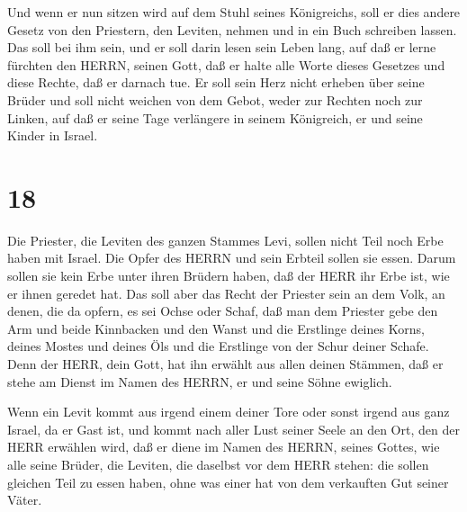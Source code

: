  Und wenn er nun sitzen wird auf dem Stuhl seines
Königreichs, soll er dies andere Gesetz von den Priestern, den Leviten,
nehmen und in ein Buch schreiben lassen.  Das soll bei ihm
sein, und er soll darin lesen sein Leben lang, auf daß er lerne fürchten
den HERRN, seinen Gott, daß er halte alle Worte dieses Gesetzes und
diese Rechte, daß er darnach tue.  Er soll sein Herz nicht
erheben über seine Brüder und soll nicht weichen von dem Gebot, weder
zur Rechten noch zur Linken, auf daß er seine Tage verlängere in seinem
Königreich, er und seine Kinder in Israel.

\hypertarget{section-17}{%
\section{18}\label{section-17}}

 Die Priester, die Leviten des ganzen Stammes Levi, sollen
nicht Teil noch Erbe haben mit Israel. Die Opfer des HERRN und sein
Erbteil sollen sie essen.  Darum sollen sie kein Erbe unter
ihren Brüdern haben, daß der HERR ihr Erbe ist, wie er ihnen geredet
hat.  Das soll aber das Recht der Priester sein an dem Volk,
an denen, die da opfern, es sei Ochse oder Schaf, daß man dem Priester
gebe den Arm und beide Kinnbacken und den Wanst  und die
Erstlinge deines Korns, deines Mostes und deines Öls und die Erstlinge
von der Schur deiner Schafe.  Denn der HERR, dein Gott, hat
ihn erwählt aus allen deinen Stämmen, daß er stehe am Dienst im Namen
des HERRN, er und seine Söhne ewiglich.

 Wenn ein Levit kommt aus irgend einem deiner Tore oder
sonst irgend aus ganz Israel, da er Gast ist, und kommt nach aller Lust
seiner Seele an den Ort, den der HERR erwählen wird,  daß er
diene im Namen des HERRN, seines Gottes, wie alle seine Brüder, die
Leviten, die daselbst vor dem HERR stehen:  die sollen
gleichen Teil zu essen haben, ohne was einer hat von dem verkauften Gut
seiner Väter.

